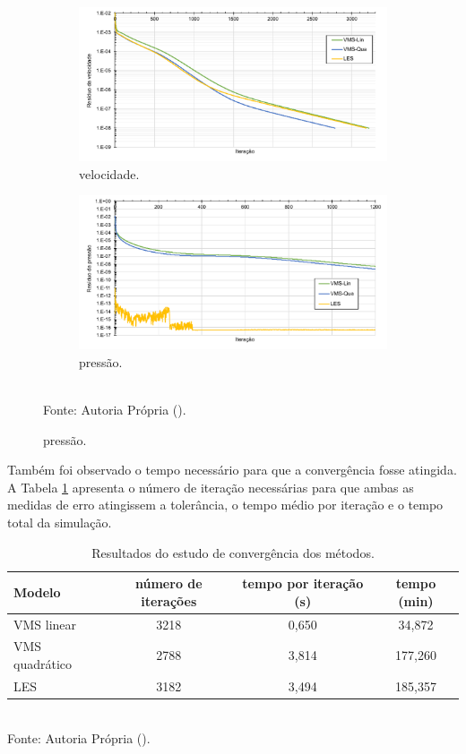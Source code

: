 \begin{figure}[h!]
    \centering
    \caption{Comparação do resíduo da:}
    \begin{subfigure}{\textwidth}
        \includegraphics[width=\linewidth]{Figuras/Cavity/resvel.pdf}
        \caption{velocidade.}
    \end{subfigure}
    \begin{subfigure}{\textwidth}
        \includegraphics[width=\linewidth]{Figuras/Cavity/respre.pdf}
        \caption{pressão.}
    \end{subfigure}
    \\Fonte: Autoria Própria (\the\year).
    \label{fig:comp-res}
\end{figure}

Também foi observado o tempo necessário para que a convergência fosse atingida. A Tabela \ref{tab:comp-res} apresenta o número de iteração necessárias para que ambas as medidas de erro atingissem a tolerância, o tempo médio por iteração e o tempo total da simulação.

\begin{table}[h!]
    \centering
    \caption{Resultados do estudo de convergência dos métodos.}
    \begin{tabular}{lccc}
        \hline
        Modelo         & número de iterações & tempo por iteração (s) & tempo (min) \\\hline
        VMS linear     & 3218                & 0,650                  & 34,872      \\
        VMS quadrático & 2788                & 3,814                  & 177,260     \\
        LES            & 3182                & 3,494                  & 185,357     \\\hline
    \end{tabular}
    \\Fonte: Autoria Própria (\the\year).
    \label{tab:comp-res}
\end{table}

